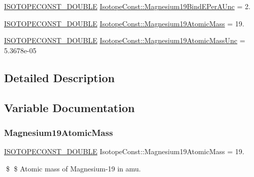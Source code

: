 \begin{DoxyCompactItemize}
\mbox{\hyperlink{group___isotope_const-_macros_ga8f45a7272ce02c0b4c65c44636ed719a}{I\+S\+O\+T\+O\+P\+E\+C\+O\+N\+S\+T\+\_\+\+D\+O\+U\+B\+LE}} \mbox{\hyperlink{group___isotope_const-_magnesium-_mg19_ga4899e76e8028c501a2656a300c011fb9}{Isotope\+Const\+::\+Magnesium19\+Bind\+E\+Per\+A\+Unc}} = 2.
\item 
\mbox{\hyperlink{group___isotope_const-_macros_ga8f45a7272ce02c0b4c65c44636ed719a}{I\+S\+O\+T\+O\+P\+E\+C\+O\+N\+S\+T\+\_\+\+D\+O\+U\+B\+LE}} \mbox{\hyperlink{group___isotope_const-_magnesium-_mg19_ga8dc0874e55ef5b01f8348db29dd8416b}{Isotope\+Const\+::\+Magnesium19\+Atomic\+Mass}} = 19.
\item 
\mbox{\hyperlink{group___isotope_const-_macros_ga8f45a7272ce02c0b4c65c44636ed719a}{I\+S\+O\+T\+O\+P\+E\+C\+O\+N\+S\+T\+\_\+\+D\+O\+U\+B\+LE}} \mbox{\hyperlink{group___isotope_const-_magnesium-_mg19_ga7c20c4b46cba9237948ae41b88abf09b}{Isotope\+Const\+::\+Magnesium19\+Atomic\+Mass\+Unc}} = 5.\+3678e-\/05
\end{DoxyCompactItemize}


\subsection{Detailed Description}


\subsection{Variable Documentation}
\mbox{\label{group___isotope_const-_magnesium-_mg19_ga8dc0874e55ef5b01f8348db29dd8416b}} 
\subsubsection{\texorpdfstring{Magnesium19\+Atomic\+Mass}{Magnesium19AtomicMass}}
{\footnotesize\ttfamily \mbox{\hyperlink{group___isotope_const-_macros_ga8f45a7272ce02c0b4c65c44636ed719a}{I\+S\+O\+T\+O\+P\+E\+C\+O\+N\+S\+T\+\_\+\+D\+O\+U\+B\+LE}} Isotope\+Const\+::\+Magnesium19\+Atomic\+Mass = 19.}

\$ \$ Atomic mass of Magnesium-\/19 in amu. \mbox{\label{group___isotope_const-_magnesium-_mg19_ga7c20c4b46cba9237948ae41b88abf09b}} 

